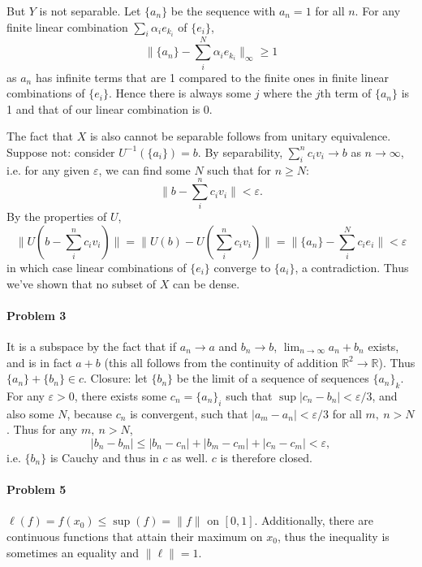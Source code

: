 \documentclass[12pt]{article}
\begin{document}
But $Y$ is not separable. Let $\{a_n\}$ be the sequence with $a_n = 1$ for
all $n$. For any finite linear combination $\sum_i\alpha_ie_{k_i}$ of $\{e_i\}$,
\begin{displaymath}
  \|\{a_n\} - \sum_i^N\alpha_ie_{k_i}\|_\infty \geq 1
\end{displaymath}
as $a_n$ has infinite terms that are 1 compared to the finite ones in finite
linear combinations of $\{e_i\}$. Hence there is always some $j$ where the
$j$th term of $\{a_n\}$ is 1 and that of our linear combination is 0.

The fact that $X$ is also cannot be separable follows from unitary equivalence.
Suppose not: consider $U^{-1}(\{a_i\}) = b$. By separability, $\sum_i^nc_iv_i
\to b$ as $n\to \infty$, i.e. for any given $\varepsilon$, we can find some
$N$ such that for $n\geq N$:
\begin{displaymath}
  \|b - \sum_i^nc_iv_i\| < \varepsilon.
\end{displaymath}
By the properties of $U$,
\begin{displaymath}
  \|U(b - \sum_i^nc_iv_i)\| = \|U(b)- U(\sum_i^nc_iv_i)\| =
  \|\{a_n\} - \sum_i^Nc_ie_i\| < \varepsilon
\end{displaymath}
in which case linear combinations of $\{e_i\}$ converge to $\{a_i\}$, a
contradiction. Thus we've shown that no subset of $X$ can be dense.



\paragraph{Problem 3}

It is a subspace by the fact that if $a_n \to a$ and $b_n \to b$, $\lim_{n\to
  \infty} a_n + b_n $ exists, and is in fact $a + b$ (this all follows from the
continuity of addition $\mathbb{R}^2 \to \mathbb{R}$). Thus $\{a_n\} + \{b_n\}
\in c$. Closure: let $\{b_n\}$
be the limit of a sequence of sequences $\{a_n\}_k$. For any $\varepsilon > 0$,
there exists some $c_n = \{a_n\}_i$ such that $\sup|c_n - b_n| < \varepsilon/3$,
and also some $N$, because $c_n$ is convergent, such that $|a_m - a_n| <
\varepsilon/3$ for all $m,\ n > N$. Thus for any $m,\ n > N$,
\begin{displaymath}
  |b_n - b_m| \leq |b_n-c_n| + |b_m-c_m| + |c_n-c_m| < \varepsilon,
\end{displaymath}
i.e. $\{b_n\}$ is Cauchy and thus in $c$ as well. $c$ is therefore closed.

\paragraph{Problem 5}
$\ell(f) = f(x_0) \leq \sup(f) = \|f\|$ on $[0,1]$. Additionally, there are
continuous functions that attain their maximum on $x_0$, thus the
inequality is sometimes an equality and $\|\ell\| = 1$.
\end{document}
